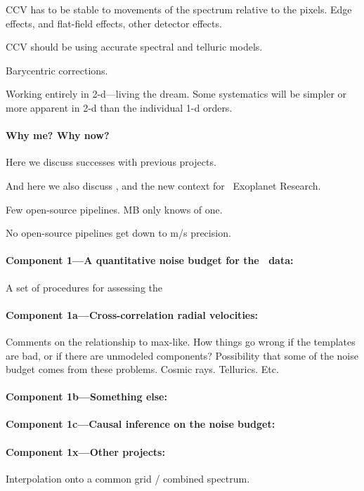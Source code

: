 \documentclass[12pt, fullpage, letterpaper]{article}
\begin{document}
CCV has to be stable to movements of the spectrum relative to the
pixels. Edge effects, and flat-field effects, other detector effects.

CCV should be using accurate spectral and telluric models.

Barycentric corrections.

Working entirely in 2-d---living the dream. Some systematics will be
simpler or more apparent in 2-d than the individual 1-d orders.

\paragraph{Why me? Why now?}
Here we discuss successes with previous projects.

And here we also discuss \NNEXPLORE, and the new context for
\NASA\ Exoplanet Research.

Few open-source pipelines. MB only knows of one.

No open-source pipelines get down to m/s precision.

\paragraph{Component 1---A quantitative noise budget for the \HARPS\ data:}
A set of procedures for assessing the 

\paragraph{Component 1a---Cross-correlation radial velocities:}
Comments on the relationship to max-like. How things go wrong
if the templates are bad, or if there are unmodeled components?
Possibility that some of the noise budget comes from these
problems. Cosmic rays. Tellurics. Etc.

\paragraph{Component 1b---Something else:}

\paragraph{Component 1c---Causal inference on the noise budget:}

\paragraph{Component 1x---Other projects:}
Interpolation onto a common grid / combined spectrum.
\end{document}
